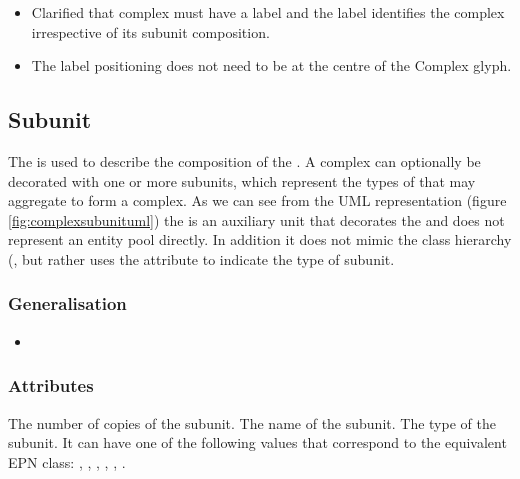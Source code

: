 \begin{itemize}
\item Clarified that complex must have a label and the label
  identifies the complex irrespective of its subunit composition.
\item The label positioning does not need to be at the centre of the
  Complex glyph.
\end{itemize}

\subsection{Subunit}
\label{defn:Subunit}\label{sec:subunits}

The  is used to describe the composition of the
. A complex can optionally be decorated with one or
more subunits, which represent the types of 
that may aggregate to form a complex. As we can see from the UML
representation (figure \ref{fig:complexsubunituml}) the
 is an auxiliary unit that decorates the
 and does not represent an entity pool directly. In
addition it does not mimic the  class
hierarchy (, but rather uses the
 attribute to indicate the type of subunit.

\subsubsection{Generalisation}

\begin{itemize}
\item {} 
\end{itemize}

\subsubsection{Attributes}

\begin{attributes}
   The number of copies of the subunit.
   The name of the subunit.
   The type of the subunit. It can have
  one of the following values that correspond to the equivalent EPN
  class: , ,
  , ,
  , .
\end{attributes}

